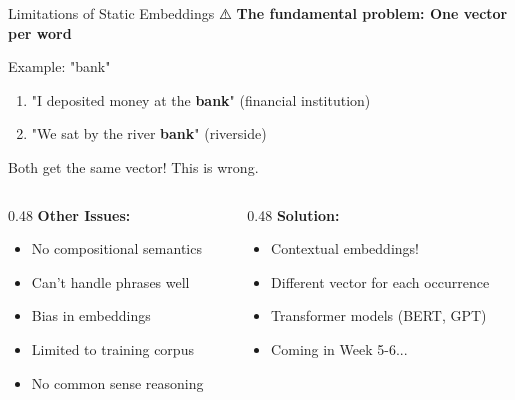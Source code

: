 \documentclass[aspectratio=169]{beamer}
\begin{document}
\begin{frame}[shrink=10]{Limitations of Static Embeddings ⚠️}
\textbf{The fundamental problem: One vector per word}

\vspace{1em}

\begin{exampleblock}{Example: "bank"}
\begin{enumerate}\setlength{\itemsep}{0pt}
    \item "I deposited money at the \textbf{bank}" (financial institution)
    \item "We sat by the river \textbf{bank}" (riverside)
\end{enumerate}
Both get the \alert{same vector}! This is wrong.
\end{exampleblock}

\vspace{1em}

\begin{columns}[T]
\begin{column}{0.48\textwidth}
\textbf{Other Issues:}
\begin{itemize}\setlength{\itemsep}{0pt}
    \item No compositional semantics
    \item Can't handle phrases well
    \item Bias in embeddings
    \item Limited to training corpus
    \item No common sense reasoning
\end{itemize}
\end{column}

\begin{column}{0.48\textwidth}
\textbf{Solution:}
\begin{itemize}\setlength{\itemsep}{0pt}
    \item \alert{Contextual embeddings!}
    \item Different vector for each occurrence
    \item Transformer models (BERT, GPT)
    \item Coming in Week 5-6...
\end{itemize}
\end{column}
\end{columns}
\end{frame}
\end{document}
